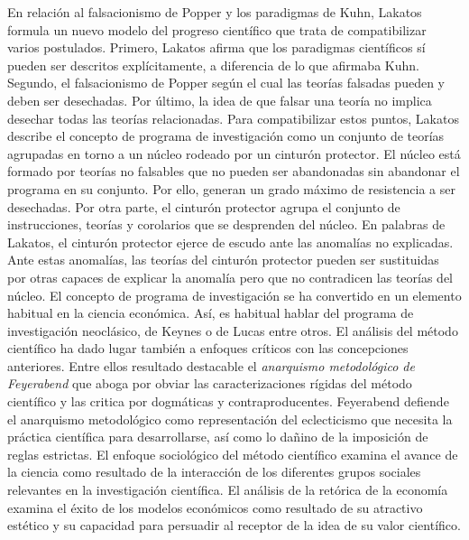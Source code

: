 \documentclass{nuevotema}
\begin{document}
En relación al falsacionismo de Popper y los paradigmas de Kuhn, Lakatos formula un nuevo modelo del progreso científico que trata de compatibilizar varios postulados. Primero, Lakatos afirma que los paradigmas científicos sí pueden ser descritos explícitamente, a diferencia de lo que afirmaba Kuhn. Segundo, el falsacionismo de Popper según el cual las teorías falsadas pueden y deben ser desechadas. Por último, la idea de que falsar una teoría no implica desechar todas las teorías relacionadas. Para compatibilizar estos puntos, Lakatos describe el concepto de programa de investigación como un conjunto de teorías agrupadas en torno a un núcleo rodeado por un cinturón protector. El núcleo está formado por teorías no falsables que no pueden ser abandonadas sin abandonar el programa en su conjunto. Por ello, generan un grado máximo de resistencia a ser desechadas. Por otra parte, el cinturón protector agrupa el conjunto de instrucciones, teorías y corolarios que se desprenden del núcleo. En palabras de Lakatos, el cinturón protector ejerce de escudo ante las anomalías no explicadas. Ante estas anomalías, las teorías del cinturón protector pueden ser sustituidas por otras capaces de explicar la anomalía pero que no contradicen las teorías del núcleo. El concepto de programa de investigación se ha convertido en un elemento habitual en la ciencia económica. Así, es habitual hablar del programa de investigación neoclásico, de Keynes o de Lucas entre otros. El análisis del método científico ha dado lugar también a enfoques críticos con las concepciones anteriores. Entre ellos resultado destacable el \textit{anarquismo metodológico de Feyerabend} que aboga por obviar las caracterizaciones rígidas del método científico y las critica por dogmáticas y contraproducentes. Feyerabend defiende el anarquismo metodológico como representación del eclecticismo que necesita la práctica científica para desarrollarse, así como lo dañino de la imposición de reglas estrictas. El enfoque sociológico del método científico examina el avance de la ciencia como resultado de la interacción de los diferentes grupos sociales relevantes en la investigación científica. El análisis de la retórica de la economía examina el éxito de los modelos económicos como resultado de su atractivo estético y su capacidad para persuadir al receptor de la idea de su valor científico. 
\end{document}
